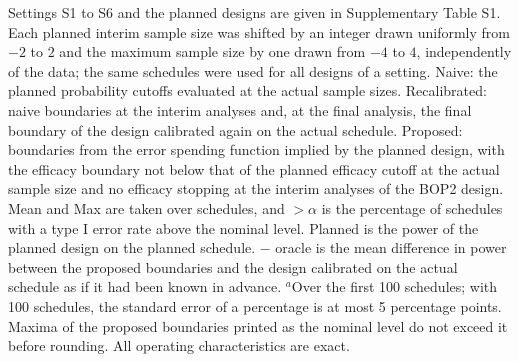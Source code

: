 \begin{table}
\begin{minipage}{0.95\textwidth}
Settings S1 to S6 and the planned designs are given in Supplementary Table S1. Each planned interim sample size was shifted by an integer drawn uniformly from $-2$ to $2$ and the maximum sample size by one drawn from $-4$ to $4$, independently of the data; the same schedules were used for all designs of a setting. Naive: the planned probability cutoffs evaluated at the actual sample sizes. Recalibrated: naive boundaries at the interim analyses and, at the final analysis, the final boundary of the design calibrated again on the actual schedule. Proposed: boundaries from the error spending function implied by the planned design, with the efficacy boundary not below that of the planned efficacy cutoff at the actual sample size and no efficacy stopping at the interim analyses of the BOP2 design. Mean and Max are taken over schedules, and $>\alpha$ is the percentage of schedules with a type I error rate above the nominal level. Planned is the power of the planned design on the planned schedule. $-$ oracle is the mean difference in power between the proposed boundaries and the design calibrated on the actual schedule as if it had been known in advance. $^{a}$Over the first 100 schedules; with 100 schedules, the standard error of a percentage is at most 5 percentage points. Maxima of the proposed boundaries printed as the nominal level do not exceed it before rounding. All operating characteristics are exact.
\end{minipage}
\end{table}
